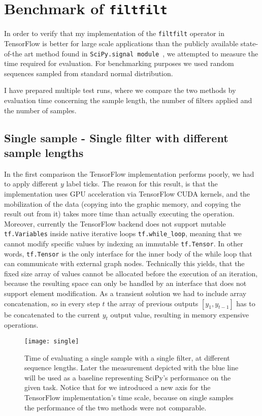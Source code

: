 \chapter{Benchmark of \texttt{filtfilt}}

In order to verify that my implementation of the \texttt{filtfilt} operator in TensorFlow is better for large scale applications than the publicly available state-of-the art method found in \texttt{SciPy.signal module}~\cite{jones_scipy:_2001}, we attempted to measure the time required for evaluation.
For benchmarking purposes we used random sequences sampled from standard normal distribution.

I have prepared multiple test runs, where we compare the two methods by evaluation time concerning the sample length, the number of filters applied and the number of samples.

\section{Single sample - Single filter with different sample lengths}
In the first comparison the TensorFlow implementation performs poorly, we had to apply different $y$ label ticks.
The reason for this result, is that the implementation uses GPU acceleration via TensorFlow CUDA kernels, and the mobilization of the data (copying into the graphic memory, and copying the result out from it) takes more time than actually executing the operation.
Moreover, currently the TensorFlow backend does not support mutable \texttt{tf.Variables} inside native iterative loops \texttt{tf.while\_loop}, meaning that we cannot modify specific values by indexing an immutable \texttt{tf.Tensor}.
 In other words, \texttt{tf.Tensor} is the only interface for the inner body of the while loop that can communicate with external graph nodes.
Technically this yields, that the fixed size array of values cannot be allocated before the execution of an iteration, because the resulting space can only be handled by an interface that does not support element modification.
As a transient solution we had to include array concatenation, so in every step $t$ the array of previous outputs $[y_{1}, y_{t-1}]$ has to be concatenated to the current $y_t$ output value, resulting in memory expensive operations.

\begin{figure}[h]
  \texttt{[image: single]}
  \caption{Time of evaluating a single sample with a single filter, at different sequence lengths. Later the measurement depicted with the blue line will be used as a baseline representing SciPy's performance on the given task. Notice that for we introduced a new axis for the TensorFlow implementation's time scale, because on single samples the performance of the two methods were not comparable.}
\end{figure}

